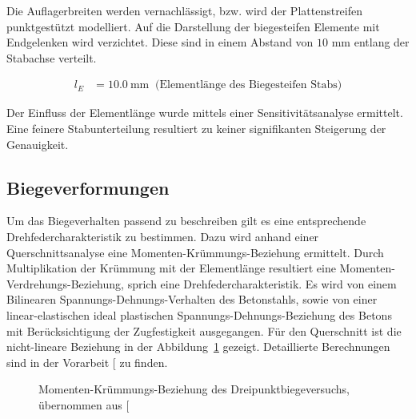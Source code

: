 \documentclass[
  11pt,
  letterpaper,
]{scrreprt}
\begin{document}
Die Auflagerbreiten werden vernachlässigt, bzw. wird der Plattenstreifen
punktgestützt modelliert. Auf die Darstellung der biegesteifen Elemente
mit Endgelenken wird verzichtet. Diese sind in einem Abstand von \(10\)
mm entlang der Stabachse verteilt.

$$
\begin{aligned}
l_{E} &= 10.0\ \mathrm{mm} \; \;\textrm{(Elementlänge des Biegesteifen Stabs)}
\end{aligned}
$$

Der Einfluss der Elementlänge wurde mittels einer Sensitivitätsanalyse
ermittelt. Eine feinere Stabunterteilung resultiert zu keiner
signifikanten Steigerung der Genauigkeit.

\subsection{Biegeverformungen}\label{biegeverformungen}

Um das Biegeverhalten passend zu beschreiben gilt es eine entsprechende
Drehfedercharakteristik zu bestimmen. Dazu wird anhand einer
Querschnittsanalyse eine Momenten-Krümmungs-Beziehung ermittelt. Durch
Multiplikation der Krümmung mit der Elementlänge resultiert eine
Momenten-Verdrehungs-Beziehung, sprich eine Drehfedercharakteristik. Es
wird von einem Bilinearen Spannungs-Dehnungs-Verhalten des Betonstahls,
sowie von einer linear-elastischen ideal plastischen
Spannungs-Dehnungs-Beziehung des Betons mit Berücksichtigung der
Zugfestigkeit ausgegangen. Für den Querschnitt ist die nicht-lineare
Beziehung in der Abbildung~\ref{fig-mchi_a3v2} gezeigt. Detaillierte
Berechnungen sind in der Vorarbeit
{[}\citeproc{ref-gitz_ansatze_2024}{1}{]} zu finden.

\begin{figure}[H]


\caption{\label{fig-mchi_a3v2}Momenten-Krümmungs-Beziehung des
Dreipunktbiegeversuchs, übernommen aus
{[}\citeproc{ref-gitz_ansatze_2024}{1}{]}}

\end{figure}%
\end{document}
